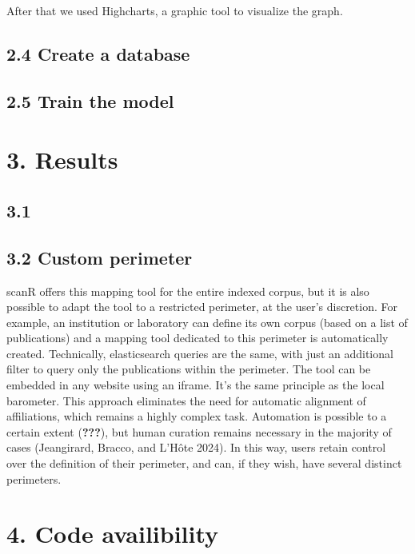 \documentclass[
]{article}
\begin{document}
After that we used Highcharts, a graphic tool to visualize the graph.

\hypertarget{create-a-database}{%
\subsection{2.4 Create a database}\label{create-a-database}}

\hypertarget{train-the-model}{%
\subsection{2.5 Train the model}\label{train-the-model}}

\hypertarget{results}{%
\section{3. Results}\label{results}}

\hypertarget{section}{%
\subsection{3.1}\label{section}}

\hypertarget{custom-perimeter}{%
\subsection{3.2 Custom perimeter}\label{custom-perimeter}}

scanR offers this mapping tool for the entire indexed corpus, but it is
also possible to adapt the tool to a restricted perimeter, at the user's
discretion. For example, an institution or laboratory can define its own
corpus (based on a list of publications) and a mapping tool dedicated to
this perimeter is automatically created. Technically, elasticsearch
queries are the same, with just an additional filter to query only the
publications within the perimeter. The tool can be embedded in any
website using an iframe. It's the same principle as the local barometer.
This approach eliminates the need for automatic alignment of
affiliations, which remains a highly complex task. Automation is
possible to a certain extent ({\textbf{???}}), but human curation
remains necessary in the majority of cases (Jeangirard, Bracco, and
L'Hôte 2024). In this way, users retain control over the definition of
their perimeter, and can, if they wish, have several distinct
perimeters.

\hypertarget{code-availibility}{%
\section{4. Code availibility}\label{code-availibility}}
\end{document}
